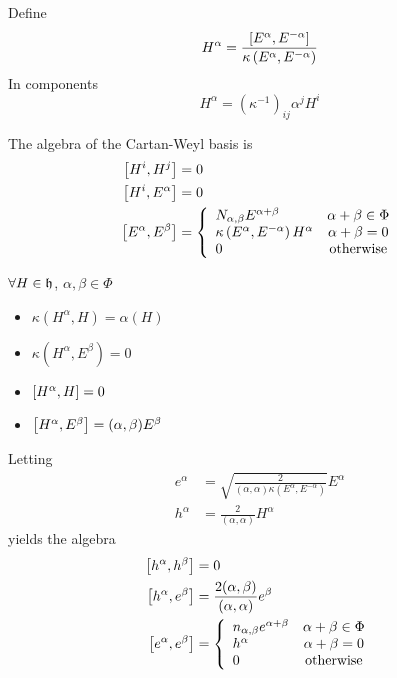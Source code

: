 \documentclass{article}
\begin{document}
\begin{definition}[$H^\alpha$]
Define 
\[
    H^\alpha = \frac{\comm[E^\alpha]{E^{-\alpha}}}{\kappa\left(E^\alpha,E^{-\alpha}\right)}
\]
In components
\[
H^\alpha = \left( \kappa^{-1}\right)_{ij} \alpha^j H^i
\]
\end{definition}

\begin{theorem}
The algebra of the Cartan-Weyl basis is 
\begin{align*}
    \comm[H^i]{H^j} &= 0 \\
    \comm[H^i]{E^\alpha} &= 0 \\
    \comm[E^\alpha]{E^\beta} &= \left\{ \begin{array}{lc} N_{\alpha,\beta}E^{\alpha+\beta} & \alpha+\beta\in\Phi \\
    \kappa\left(E^\alpha,E^{-\alpha}\right)H^\alpha & \alpha+\beta=0 \\
    0 & \text{otherwise}
    \end{array} \right. \\
\end{align*}
\end{theorem}

\begin{fact}
$\forall H\in\mf{h}$, $\alpha,\beta\in\Phi$
\begin{itemize}
    \item $\kappa\left(H^\alpha,H\right)=\alpha(H)$
    \item $\kappa\left(H^\alpha,E^\beta\right)=0$
    \item $\comm[H^\alpha]{H}=0$
    \item $\comm[H^\alpha]{E^\beta}=(\alpha,\beta)E^\beta$
\end{itemize}
\end{fact}

\begin{theorem}
Letting 
\begin{align*}
    e^\alpha &= \sqrt{\frac{2}{(\alpha,\alpha)\kappa\left(E^\alpha,E^{-\alpha}\right)}}E^\alpha \\
    h^\alpha &= \frac{2}{(\alpha,\alpha)}H^\alpha
\end{align*}
yields the algebra
\begin{align*}
    \comm[h^\alpha]{h^\beta} &= 0 \\
    \comm[h^\alpha]{e^\beta} &= \frac{2(\alpha,\beta)}{(\alpha,\alpha)}e^\beta \\
    \comm[e^\alpha]{e^\beta} &= \left\{ \begin{array}{lc} n_{\alpha,\beta}e^{\alpha+\beta} & \alpha+\beta\in\Phi \\
    h^\alpha & \alpha+\beta=0 \\
    0 & \text{otherwise}
    \end{array} \right.\\
\end{align*}
\end{theorem}
\end{document}
